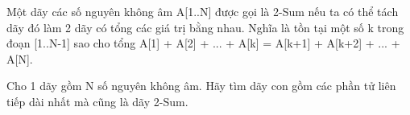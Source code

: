 Một dãy các số nguyên không âm A[1..N] được gọi là 2-Sum nếu ta có thể tách dãy đó làm 2 dãy có tổng các giá trị bằng nhau. Nghĩa là tồn tại một số k trong đoạn [1..N-1] sao cho tổng A[1] + A[2] + ... + A[k] = A[k+1] + A[k+2] + ... + A[N].  

   Cho 1 dãy gồm N số nguyên không âm. Hãy tìm dãy con gồm các phần tử liên tiếp dài nhất mà cũng là dãy 2-Sum.  

\
